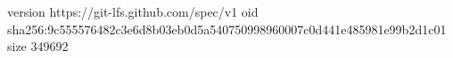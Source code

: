version https://git-lfs.github.com/spec/v1
oid sha256:9c555576482c3e6d8b03eb0d5a540750998960007c0d441e485981e99b2d1c01
size 349692
